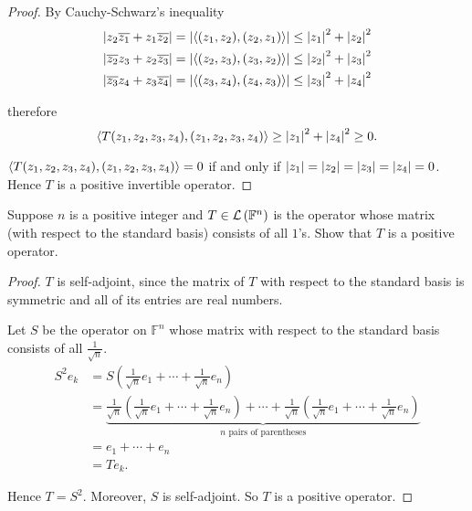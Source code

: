 \begin{proof}
    By Cauchy-Schwarz's inequality
    \[
        \begin{split}
            \left\vert{z_{2}\overline{z_{1}} + z_{1}\overline{z_{2}}}\right\vert = \left\vert{\left\langle{(z_{1}, z_{2}), (z_{2}, z_{1})}\right\rangle}\right\vert \leq \left\vert{z_{1}}\right\vert^{2} + \left\vert{z_{2}}\right\vert^{2} \\
            \left\vert{\overline{z_{2}}z_{3} + z_{2}\overline{z_{3}}}\right\vert = \left\vert{\left\langle{(z_{2}, z_{3}), (z_{3}, z_{2})}\right\rangle}\right\vert \leq \left\vert{z_{2}}\right\vert^{2} + \left\vert{z_{3}}\right\vert^{2} \\
            \left\vert{\overline{z_{3}}z_{4} + z_{3}\overline{z_{4}}}\right\vert = \left\vert{\left\langle{(z_{3}, z_{4}), (z_{4}, z_{3})}\right\rangle}\right\vert \leq \left\vert{z_{3}}\right\vert^{2} + \left\vert{z_{4}}\right\vert^{2}
        \end{split}
    \]

    therefore
    \[
        \left\langle{T(z_{1}, z_{2}, z_{3}, z_{4}), (z_{1}, z_{2}, z_{3}, z_{4})}\right\rangle \geq \left\vert{z_{1}}\right\vert^{2} + \left\vert{z_{4}}\right\vert^{2} \geq 0.
    \]

    $\left\langle{T(z_{1}, z_{2}, z_{3}, z_{4}), (z_{1}, z_{2}, z_{3}, z_{4})}\right\rangle = 0$ if and only if $\left\vert{z_{1}}\right\vert = \left\vert{z_{2}}\right\vert = \left\vert{z_{3}}\right\vert = \left\vert{z_{4}}\right\vert = 0$. Hence $T$ is a positive invertible operator.
\end{proof}
\newpage

\begin{exercise}
    Suppose $n$ is a positive integer and $T\in\mathcal{L}\left({\mathbb{F}^{n}}\right)$ is the operator whose matrix (with respect to the standard basis) consists of all $1$'s. Show that $T$ is a positive operator.
\end{exercise}

\begin{proof}
    $T$ is self-adjoint, since the matrix of $T$ with respect to the standard basis is symmetric and all of its entries are real numbers.

    Let $S$ be the operator on $\mathbb{F}^{n}$ whose matrix with respect to the standard basis consists of all $\frac{1}{\sqrt{n}}$.
    \begin{align*}
        S^{2}e_{k} & = S\left(\frac{1}{\sqrt{n}}e_{1} + \cdots + \frac{1}{\sqrt{n}}e_{n}\right)                                                                                                                                                                      \\
                   & = \underbrace{\frac{1}{\sqrt{n}}\left(\frac{1}{\sqrt{n}}e_{1} + \cdots + \frac{1}{\sqrt{n}}e_{n}\right) + \cdots + \frac{1}{\sqrt{n}}\left(\frac{1}{\sqrt{n}}e_{1} + \cdots + \frac{1}{\sqrt{n}}e_{n}\right)}_{\text{$n$ pairs of parentheses}} \\
                   & = e_{1} + \cdots + e_{n}                                                                                                                                                                                                                        \\
                   & = Te_{k}.
    \end{align*}

    Hence $T = S^{2}$. Moreover, $S$ is self-adjoint. So $T$ is a positive operator.
\end{proof}
\newpage

